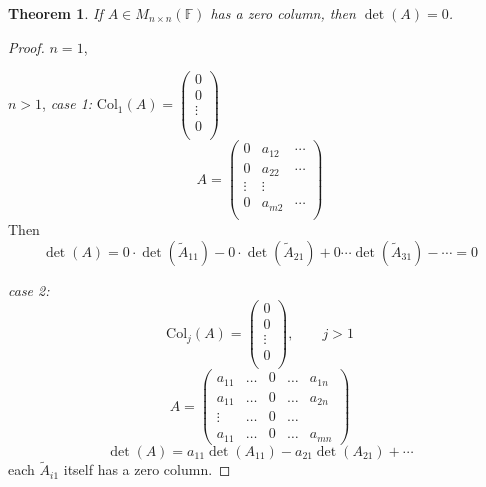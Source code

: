 \documentclass[12pt]{article}
\newtheorem{theorem}{Theorem}[subsection]
\newcommand{\Col}{\mathrm{Col}}
\newcommand{\mF}{{\mathbb{F}}}
\begin{document}
\begin{theorem}
	If $A \in M_{n\times n} (\mF)$ has a zero column, then $\det(A) = 0$.
\end{theorem}
\begin{proof}
	$n = 1$,

	$n>1$, \textit{case 1: } $\Col_1(A) = 
	\begin{pmatrix}
		0	\\
		0	\\
		\vdots	\\
		0	\\
	\end{pmatrix}$
	\[
		A = 
		\begin{pmatrix}
			0 & a_{12} & \cdots		\\
			0 & a_{22} & \cdots		\\
			\vdots & \vdots		\\
			0 & a_{m2} & \cdots		\\
		\end{pmatrix}
	\]
	Then 
	\[
		\det(A) = 0\cdot \det(\tilde A_{11}) - 0\cdot \det(\tilde A_{21})
		+ 0\cdots \det(\tilde A_{31}) - \cdots
		= 0
	\]

	\textit{case 2:} 
	\[
		\Col_j(A) = \begin{pmatrix}
		0	\\
		0	\\
		\vdots	\\
		0	\\
	\end{pmatrix}, \qquad j > 1
	\]
	\[
		A = 
		\begin{pmatrix}
			a_{11}  & \ldots & 0 & \ldots & a_{1n}	\\
			a_{11}  & \ldots & 0 & \ldots & a_{2n}	\\
			\vdots  & \ldots & 0 & \ldots &			\\
			a_{11}  & \ldots & 0 & \ldots & a_{mn}	
		\end{pmatrix}
	\]
	\[
		\det(A) = a_{11} \det(A_{11}) - a_{21} \det(A_{21}) + \cdots
	\]
	each $\tilde A_{i1}$ itself has a zero column. 
\end{proof}





\newpage
\end{document}
